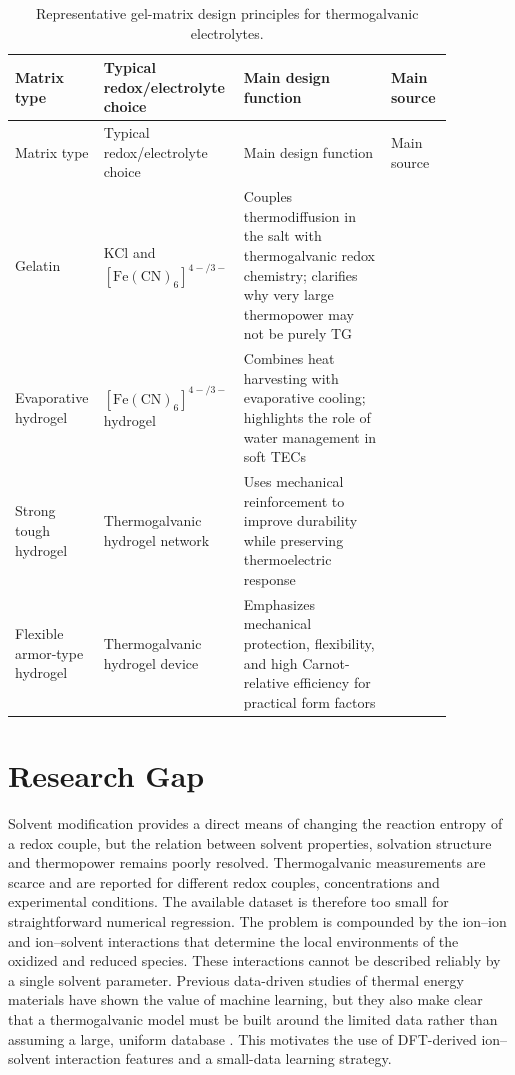 \documentclass[a4paper,12pt]{report}
\begin{document}
\begin{longtable}{>{\raggedright\arraybackslash}p{0.18\linewidth}
>{\raggedright\arraybackslash}p{0.22\linewidth}
>{\raggedright\arraybackslash}p{0.33\linewidth}
>{\raggedright\arraybackslash}p{0.14\linewidth}}
\caption{Representative gel-matrix design principles for thermogalvanic
electrolytes.}\\
\toprule
Matrix type & Typical redox/electrolyte choice & Main design function & Main
source \\
\midrule
\endfirsthead
\toprule
Matrix type & Typical redox/electrolyte choice & Main design function & Main
source \\
\midrule
\endhead
Gelatin & KCl and $[\mathrm{Fe(CN)}_6]^{4-/3-}$ & Couples thermodiffusion in
the salt with thermogalvanic redox chemistry; clarifies why very
large thermopower may not be purely TG & \citep{han2020gelatin} \\
Evaporative hydrogel & $[\mathrm{Fe(CN)}_6]^{4-/3-}$ hydrogel & Combines heat
harvesting with evaporative cooling; highlights the role of water management
in soft TECs & \citep{zhou2020hydrogel} \\
Strong tough hydrogel & Thermogalvanic hydrogel network & Uses mechanical
reinforcement to improve durability while preserving thermoelectric response &
\citep{yang2023strong} \\
Flexible armor-type hydrogel & Thermogalvanic hydrogel device & Emphasizes
mechanical protection, flexibility, and high Carnot-relative efficiency for
practical form factors & \citep{liu2024armor} \\
\bottomrule
\end{longtable}

\section{Research Gap}

Solvent modification provides a direct means of changing the reaction entropy
of a redox couple, but the relation between solvent properties, solvation
structure and thermopower remains poorly resolved. Thermogalvanic measurements
are scarce and are reported for different redox couples, concentrations and
experimental conditions. The available dataset is therefore too small for
straightforward numerical regression. The problem is compounded by the
ion--ion and ion--solvent interactions that determine the local environments
of the oxidized and reduced species. These interactions cannot be described
reliably by a single solvent parameter. Previous data-driven studies of thermal
energy materials have shown the value of machine learning, but they also make
clear that a thermogalvanic model must be built around the limited data rather
than assuming a large, uniform database \citep{wu2024unlocking,li2022mlthermal}.
This motivates the use of DFT-derived ion--solvent interaction features and a
small-data learning strategy.
\end{document}
